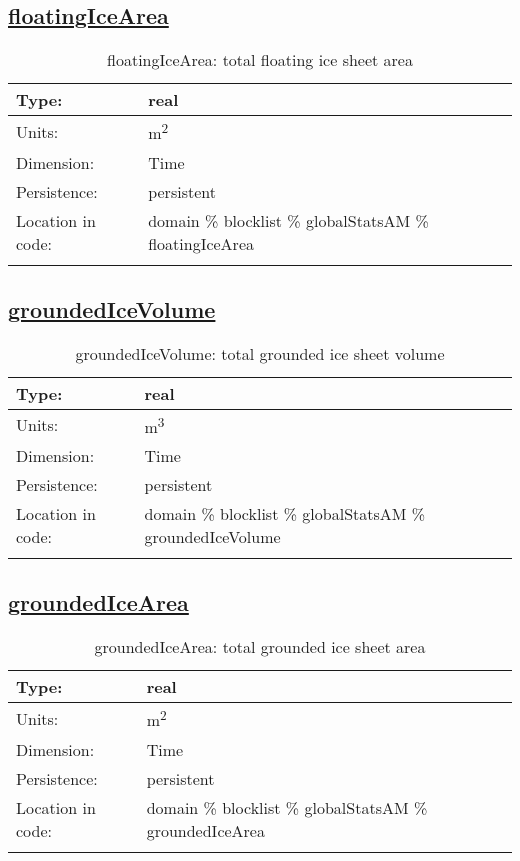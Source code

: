 \subsection[floatingIceArea]{\hyperref[sec:var_tab_globalStatsAM]{floatingIceArea}}
\label{subsec:var_sec_globalStatsAM_floatingIceArea}
\begin{center}
\begin{longtable}{| p{2.0in} | p{4.0in} |}
        \hline 
        Type: & real \\
        \hline 
        Units: & \si{m^2} \\
        \hline 
        Dimension: & Time \\
        \hline 
        Persistence: & persistent \\
        \hline 
         Location in code: & domain \% blocklist \% globalStatsAM \% floatingIceArea \\
         \hline 
    \caption{floatingIceArea: total floating ice sheet area}
\end{longtable}
\end{center}
\subsection[groundedIceVolume]{\hyperref[sec:var_tab_globalStatsAM]{groundedIceVolume}}
\label{subsec:var_sec_globalStatsAM_groundedIceVolume}
\begin{center}
\begin{longtable}{| p{2.0in} | p{4.0in} |}
        \hline 
        Type: & real \\
        \hline 
        Units: & \si{m^3} \\
        \hline 
        Dimension: & Time \\
        \hline 
        Persistence: & persistent \\
        \hline 
         Location in code: & domain \% blocklist \% globalStatsAM \% groundedIceVolume \\
         \hline 
    \caption{groundedIceVolume: total grounded ice sheet volume}
\end{longtable}
\end{center}
\subsection[groundedIceArea]{\hyperref[sec:var_tab_globalStatsAM]{groundedIceArea}}
\label{subsec:var_sec_globalStatsAM_groundedIceArea}
\begin{center}
\begin{longtable}{| p{2.0in} | p{4.0in} |}
        \hline 
        Type: & real \\
        \hline 
        Units: & \si{m^2} \\
        \hline 
        Dimension: & Time \\
        \hline 
        Persistence: & persistent \\
        \hline 
         Location in code: & domain \% blocklist \% globalStatsAM \% groundedIceArea \\
         \hline 
    \caption{groundedIceArea: total grounded ice sheet area}
\end{longtable}
\end{center}
